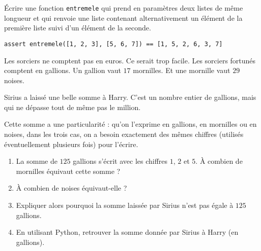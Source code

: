 \documentclass[a4paper,dvipsnames]{article}
\begin{document}
\medskip

\begin{exercice}{}{}
  Écrire une fonction \texttt{entremele} qui prend en paramètres deux listes de même longueur et qui renvoie une liste contenant alternativement un élément de la première liste suivi d'un élément de la seconde.

      \begin{verbatim}
assert entremele([1, 2, 3], [5, 6, 7]) == [1, 5, 2, 6, 3, 7]
      \end{verbatim}

\end{exercice}

\medskip

\begin{exercice}{}{}
  Les sorciers ne comptent pas en euros. Ce serait trop facile. Les sorciers fortunés comptent en gallions. Un gallion vaut $17$ mornilles. Et une mornille vaut $29$ noises.

  Sirius a laissé une belle somme à Harry. C'est un nombre entier de gallions, mais qui ne dépasse tout de même pas le million.

  Cette somme a une particularité : qu'on l'exprime en gallions, en mornilles ou en noises, dans les trois cas, on a besoin exactement des mêmes chiffres (utilisés éventuellement plusieurs fois) pour l'écrire.

  \begin{enumerate}
    \item La somme de $125$ gallions s'écrit avec les chiffres $1$, $2$ et $5$. À combien de mornilles équivaut cette somme ?
    \item À combien de noises équivaut-elle ?
    \item Expliquer alors pourquoi la somme laissée par Sirius n'est pas égale à $125$ gallions.
    \item En utilisant Python, retrouver la somme donnée par Sirius à Harry (en gallions).
  \end{enumerate}
\end{exercice}
\end{document}
